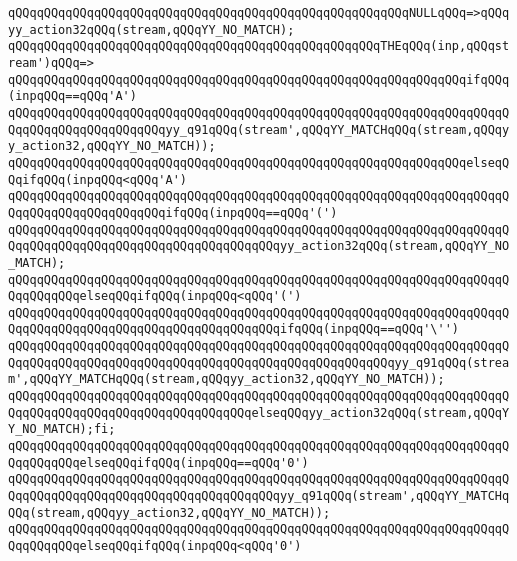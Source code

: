 \verb|qQQqqQQqqQQqqQQqqQQqqQQqqQQqqQQqqQQqqQQqqQQqqQQqqQQqqQQqNULLqQQq=>qQQqyy_action32qQQq(stream,qQQqYY_NO_MATCH);|\newline
\verb|qQQqqQQqqQQqqQQqqQQqqQQqqQQqqQQqqQQqqQQqqQQqqQQqqQQqTHEqQQq(inp,qQQqstream')qQQq=>|\newline
\verb|qQQqqQQqqQQqqQQqqQQqqQQqqQQqqQQqqQQqqQQqqQQqqQQqqQQqqQQqqQQqqQQqifqQQq(inpqQQq==qQQq'A')|\newline
\verb|qQQqqQQqqQQqqQQqqQQqqQQqqQQqqQQqqQQqqQQqqQQqqQQqqQQqqQQqqQQqqQQqqQQqqQQqqQQqqQQqqQQqqQQqqQQqyy_q91qQQq(stream',qQQqYY_MATCHqQQq(stream,qQQqyy_action32,qQQqYY_NO_MATCH));|\newline
\verb|qQQqqQQqqQQqqQQqqQQqqQQqqQQqqQQqqQQqqQQqqQQqqQQqqQQqqQQqqQQqqQQqelseqQQqifqQQq(inpqQQq<qQQq'A')|\newline
\verb|qQQqqQQqqQQqqQQqqQQqqQQqqQQqqQQqqQQqqQQqqQQqqQQqqQQqqQQqqQQqqQQqqQQqqQQqqQQqqQQqqQQqqQQqqQQqifqQQq(inpqQQq==qQQq'(')|\newline
\verb|qQQqqQQqqQQqqQQqqQQqqQQqqQQqqQQqqQQqqQQqqQQqqQQqqQQqqQQqqQQqqQQqqQQqqQQqqQQqqQQqqQQqqQQqqQQqqQQqqQQqqQQqqQQqyy_action32qQQq(stream,qQQqYY_NO_MATCH);|\newline
\verb|qQQqqQQqqQQqqQQqqQQqqQQqqQQqqQQqqQQqqQQqqQQqqQQqqQQqqQQqqQQqqQQqqQQqqQQqqQQqqQQqelseqQQqifqQQq(inpqQQq<qQQq'(')|\newline
\verb|qQQqqQQqqQQqqQQqqQQqqQQqqQQqqQQqqQQqqQQqqQQqqQQqqQQqqQQqqQQqqQQqqQQqqQQqqQQqqQQqqQQqqQQqqQQqqQQqqQQqqQQqqQQqifqQQq(inpqQQq==qQQq'\'')|\newline
\verb|qQQqqQQqqQQqqQQqqQQqqQQqqQQqqQQqqQQqqQQqqQQqqQQqqQQqqQQqqQQqqQQqqQQqqQQqqQQqqQQqqQQqqQQqqQQqqQQqqQQqqQQqqQQqqQQqqQQqqQQqqQQqyy_q91qQQq(stream',qQQqYY_MATCHqQQq(stream,qQQqyy_action32,qQQqYY_NO_MATCH));|\newline
\verb|qQQqqQQqqQQqqQQqqQQqqQQqqQQqqQQqqQQqqQQqqQQqqQQqqQQqqQQqqQQqqQQqqQQqqQQqqQQqqQQqqQQqqQQqqQQqqQQqqQQqqQQqelseqQQqyy_action32qQQq(stream,qQQqYY_NO_MATCH);fi;|\newline
\verb|qQQqqQQqqQQqqQQqqQQqqQQqqQQqqQQqqQQqqQQqqQQqqQQqqQQqqQQqqQQqqQQqqQQqqQQqqQQqqQQqelseqQQqifqQQq(inpqQQq==qQQq'0')|\newline
\verb|qQQqqQQqqQQqqQQqqQQqqQQqqQQqqQQqqQQqqQQqqQQqqQQqqQQqqQQqqQQqqQQqqQQqqQQqqQQqqQQqqQQqqQQqqQQqqQQqqQQqqQQqqQQqyy_q91qQQq(stream',qQQqYY_MATCHqQQq(stream,qQQqyy_action32,qQQqYY_NO_MATCH));|\newline
\verb|qQQqqQQqqQQqqQQqqQQqqQQqqQQqqQQqqQQqqQQqqQQqqQQqqQQqqQQqqQQqqQQqqQQqqQQqqQQqqQQqelseqQQqifqQQq(inpqQQq<qQQq'0')|\newline
